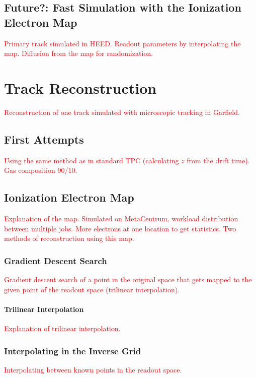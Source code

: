 \documentclass[]{article}
\begin{document}
		\subsection{Future?: Fast Simulation with the Ionization Electron Map}
			\textcolor{red}{Primary track simulated in HEED. Readout parameters by interpolating the map. Diffusion from the map for randomization.}
	
	\section{Track Reconstruction}
		\textcolor{red}{Reconstruction of one track simulated with microscopic tracking in Garfield.}
		
		\subsection{First Attempts}
			\textcolor{red}{Using the same method as in standard TPC (calculating $z$ from the drift time). Gas composition 90/10.}
			
		\subsection{Ionization Electron Map}
			\textcolor{red}{Explanation of the map. Simulated on MetaCentrum, workload distribution between multiple jobs. More electrons at one location to get statistics. Two methods of reconstruction using this map.}
			
			\subsubsection{Gradient Descent Search}
				\textcolor{red}{Gradient descent search of a point in the original space that gets mapped to the given point of the readout space (trilinear interpolation).}
			
				\paragraph{Trilinear Interpolation}
					\textcolor{red}{\newline Explanation of trilinear interpolation.}
					
			\subsubsection{Interpolating in the Inverse Grid}
				\textcolor{red}{Interpolating between known points in the readout space.}
		
\end{document}
